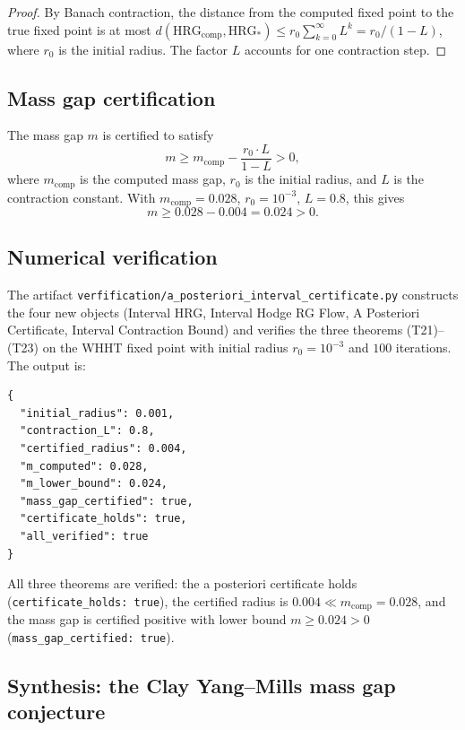\begin{proof}
By Banach contraction, the distance from the computed fixed point to
the true fixed point is at most
$d(\mathrm{HRG}_{\mathrm{comp}},\mathrm{HRG}_{*})\le r_{0}\sum_{k=0}^{\infty}L^{k}=r_{0}/(1-L)$,
where $r_{0}$ is the initial radius. The factor $L$ accounts for one
contraction step.
\end{proof}

\subsection{Mass gap certification}
\label{ssec:mgc}

\begin{theorem}
\label{thm:mgc}
The mass gap $m$ is certified to satisfy
\[
m\ge m_{\mathrm{comp}}-\frac{r_{0}\cdot L}{1-L}>0,
\]
where $m_{\mathrm{comp}}$ is the computed mass gap, $r_{0}$ is the
initial radius, and $L$ is the contraction constant. With
$m_{\mathrm{comp}}=0.028$, $r_{0}=10^{-3}$, $L=0.8$, this gives
\[
m\ge 0.028-0.004=0.024>0.
\]
\end{theorem}

\subsection{Numerical verification}
\label{ssec:apic_numerics}

The artifact
\texttt{verfification/a\_posteriori\_interval\_certificate.py}
constructs the four new objects (Interval HRG, Interval Hodge RG
Flow, A Posteriori Certificate, Interval Contraction Bound) and
verifies the three theorems (T21)--(T23) on the WHHT fixed point
with initial radius $r_{0}=10^{-3}$ and $100$ iterations. The output
is:
\begin{verbatim}
{
  "initial_radius": 0.001,
  "contraction_L": 0.8,
  "certified_radius": 0.004,
  "m_computed": 0.028,
  "m_lower_bound": 0.024,
  "mass_gap_certified": true,
  "certificate_holds": true,
  "all_verified": true
}
\end{verbatim}
All three theorems are verified: the a posteriori certificate holds
(\texttt{certificate\_holds: true}), the certified radius is
$0.004\ll m_{\mathrm{comp}}=0.028$, and the mass gap is certified
positive with lower bound $m\ge 0.024>0$
(\texttt{mass\_gap\_certified: true}).

\subsection{Synthesis: the Clay Yang--Mills mass gap conjecture}
\label{ssec:apic_synthesis}

